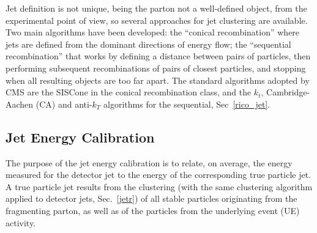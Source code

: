 Jet definition is not unique, being the parton not a well-defined object, from the experimental point of view, so several
approaches for jet clustering are available. Two main algorithms have been developed: the ``conical recombination''
where jets are defined from the dominant directions of energy flow; the ``sequential recombination'' that works by defining a distance
between pairs of particles, then performing subsequent recombinations of pairs of closest
particles, and stopping when all resulting objects are too far apart. The standard algorithms adopted by
CMS are the SISCone in the conical recombination class, and the $k_t$, Cambridge-Aachen (CA) and anti-$k_T$ algorithms for the sequential, Sec~\ref{rico_jet}.\\
\newline
\subsection*{Jet Energy Calibration}
The purpose of the jet energy calibration is to relate, on average, the energy measured for the
detector jet to the energy of the corresponding true particle jet.  A true particle jet results from
the clustering (with the same clustering algorithm applied to detector jets, Sec.~\ref{jetr}) of all stable particles
originating from the fragmenting parton, as well as of the particles from the underlying event
(UE) activity. 

